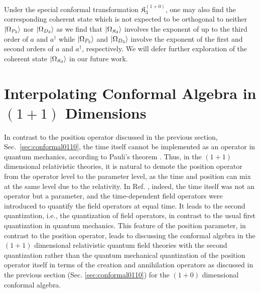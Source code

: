 \documentclass[%
 reprint,
superscriptaddress,
 amsmath,amssymb,
 aps,
]{revtex4-2}
\begin{document}
Under the special conformal transformation $\mathfrak{K}^{(1+0)}_{{3}}$, one may also find the corresponding coherent state which is not expected to be orthogonal to neither $\ket{\Omega_{P_{3}}}$ nor $\ket{\Omega_{D_{3}}}$ as we find that $\ket{\Omega_{\mathfrak{K}_{3}}}$ involves the exponent of up to the third order of $a$ and $a^\dagger$ while $\ket{\Omega_{P_{3}}}$ and $\ket{\Omega_{D_{3}}}$ involve the exponent of the first and second orders of $a$ and $a^\dagger$, respectively. We will defer further exploration of the coherent state $\ket{\Omega_{\mathfrak{K}_{3}}}$ in our future work.



\section{Interpolating Conformal Algebra in \texorpdfstring{$(1+1)$}{Lg} Dimensions}
\label{sec:conformal}

In contrast to the position operator discussed in the previous section, Sec.~\ref{sec:conformal0110}, the time itself cannot be implemented as an operator in quantum mechanics, according to Pauli's theorem \cite{Pauli1980}. Thus, in the $(1+1)$ dimensional relativistic theories, it is natural to demote the position operator from the operator level to the parameter level, as the time and position can mix at the same level due to the relativity. In Ref. \cite{Fubini1976}, indeed, the time itself was not an operator but a parameter, and the time-dependent field operators were introduced to quantify the field operators at equal time. It leads to the second quantization, i.e., the quantization of field operators, in contrast to the usual first quantization in quantum mechanics. This feature of the position parameter, in contrast to the position operator, leads to discussing the conformal algebra in the $(1+1)$ dimensional relativistic quantum field theories with the second quantization rather than the quantum mechanical quantization of the position operator itself in terms of the creation and annihilation operators as discussed in the previous section (Sec. \ref{sec:conformal0110}) for the $(1+0)$ dimensional conformal algebra. 
\end{document}
